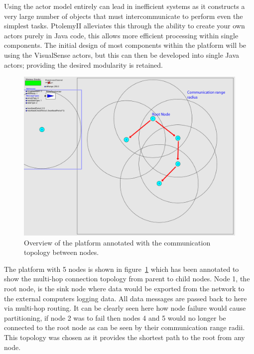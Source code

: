 \documentclass[authoryearcitations]{UoYCSproject}
\begin{document}
Using the actor model entirely can lead in inefficient systems as it constructs a very large number of objects that must intercommunicate to perform even the simplest tasks. PtolemyII alleviates this through the ability to create your own actors purely in Java code, this allows more efficient processing within single components. The initial design of most components within the platform will be using the VisualSense actors, but this can then be developed into single Java actors; providing the desired modularity is retained.

\begin{figure}
 \centering
    \includegraphics[width=\textwidth]{figures/nodeModel.png}
    \caption{Overview of the platform annotated with the communication topology between nodes.}
    \label{fig:nodeModel}
\end{figure}

The platform with 5 nodes is shown in figure~\ref{fig:nodeModel} which has been annotated to show the multi-hop connection topology from parent to child nodes. Node 1, the root node, is the sink node where data would be exported from the network to the external computers logging data. All data messages are passed back to here via multi-hop routing. It can be clearly seen here how node failure would cause partitioning, if node 2 was to fail then nodes 4 and 5 would no longer be connected to the root node as can be seen by their communication range radii. This topology was chosen as it provides the shortest path to the root from any node.
\end{document}
